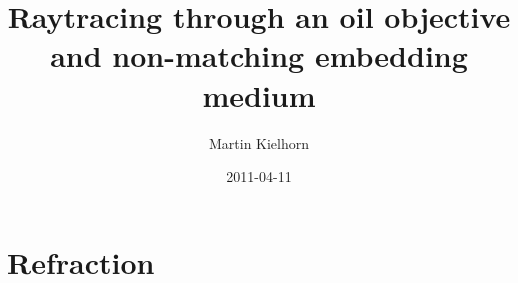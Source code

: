 \documentclass[twocolumn,DIV19]{scrartcl}
\title{Raytracing through an oil objective and non-matching embedding
  medium}
\author{Martin Kielhorn}
\date{2011-04-11}
\begin{document}
\maketitle

\setcounter{tocdepth}{3}
\tableofcontents
\vspace*{1cm}

\newcommand{\vect}[1]{\mathbf{#1}}
\renewcommand{\r}{\vect r}
\renewcommand{\a}{\vect a}
\newcommand{\s}{\vect s}
\def\k{\vect k}
\def\d{\vect d}
\def\e{\vect e}
\def\f{\vect f}
\def\c{\vect c}
\def\x{\vect x}
\def\y{\vect y}
\def\z{\vect z}
\def\q{\vect q}
\def\p{\vect p}
\def\l{\vect l}

\newcommand{\nvect}[1]{\vect{\hat{#1}}}
\renewcommand{\i}{\nvect i}
\def\hc{\nvect c}
\def\hs{\nvect s}
\def\hd{\nvect d}
\def\hx{\nvect x}
\def\hy{\nvect y}

\def\hz{\nvect z}
\def\n{\nvect n}
\def\t{\nvect t}
\def\m{\nvect m}
\def\vrho{\boldsymbol\rho}
\def\abs#1{\mathopen| #1 \mathclose|}

\newcommand{\bild}[1]{\texttt{[image: \#1]}}
\section{Refraction}
\end{document}
